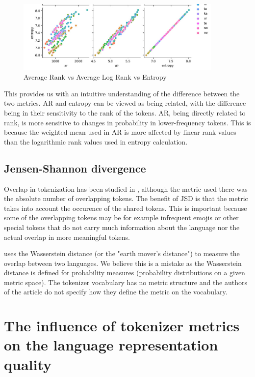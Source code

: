\begin{figure}
    \centering
    \includegraphics[width=0.9\textwidth]{img/temp/ar_alr_entropy.jpg}
    \caption{Average Rank vs Average Log Rank vs Entropy}
    \label{fig:ar_alr_entropy}
\end{figure}

This provides us with an intuitive understanding of the difference between the two metrics. AR and entropy can be viewed as being related, with the difference being in their sensitivity to the rank of the tokens. AR, being directly related to rank, is more sensitive to changes in probability in lower-frequency tokens. This is because the weighted mean used in AR is more affected by linear rank values than the logarithmic rank values used in entropy calculation.

\subsection{Jensen-Shannon divergence}


Overlap in tokenization has been studied in \citet{wu_beto_2019}, although the metric used there was the absolute number of overlapping tokens. The benefit of JSD is that the metric takes into account the occurence of the shared tokens. This is important because some of the overlapping tokens may be for example infrequent emojis or other special tokens that do not carry much information about the language nor the actual overlap in more meaningful tokens.

\citet{chung_improving_2020} uses the Wasserstein distance (or the "earth mover's distance") to measure the overlap between two languages. We believe this is a mistake as the Wasserstein distance is defined for probability measures (probability distributions on a given metric space). The tokenizer vocabulary has no metric structure and the authors of the article do not specify how they define the metric on the vocabulary.


\section{The influence of tokenizer metrics on the language representation quality}
\label{sec:influence_of_metrics}

